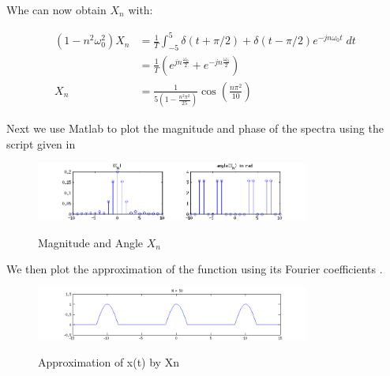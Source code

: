 Whe can now obtain $X_n$ with:

\begin{equation*}
\begin{aligned}
(1 - n^2 \omega_0^2) X_n &= \frac{1}{T} \int_{-5}^5 \delta(t+\pi/2) + \delta(t-\pi/2) 
e^{-j n \omega_0 t} \; dt \\
&=\frac{1}{T} ( e^{j n \frac{\omega_0}{2}} + e^{- j n \frac{\omega_0}{2}} ) \\
X_n &= \frac{1}{5(1-\frac{n^2 \pi^2}{25})} \cos(\frac{n \pi^2}{10})
\end{aligned}
\end{equation*} 

Next we use Matlab to plot the magnitude and phase of the spectra using the script given in \cite{wprobl_c1}


\begin{figure}[H]
\caption{Magnitude and Angle $X_n$}
\centering
\includegraphics[width=0.8\textwidth]{figs/c1p2b.png}
\label{fig:c1p1b}
\end{figure} 

We then plot the approximation of the function using its Fourier coefficients 
\cite{wprobl_c1}.


\begin{figure}[H]
\caption{Approximation of x(t) by Xn}
\centering
\includegraphics[width=0.8\textwidth]{figs/c1p2c.png}
\label{fig:c1p1c}
\end{figure} 
